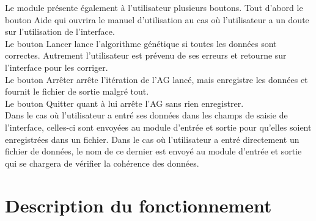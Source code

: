 \documentclass[a4paper,11pt]{article}
\begin{document}
			Le module présente également à l’utilisateur plusieurs boutons.
			Tout d’abord le bouton Aide qui ouvrira le manuel d’utilisation au cas où l’utilisateur a un doute sur l’utilisation de l’interface.\\
			Le bouton Lancer lance l’algorithme génétique si toutes les données sont correctes.
			Autrement l’utilisateur est prévenu de ses erreurs et retourne sur l’interface pour les corriger.\\
			Le bouton Arrêter arrête l’itération de l’AG lancé, mais enregistre les données et fournit le fichier de sortie malgré tout.\\
			Le bouton Quitter quant à lui arrête l’AG sans rien enregistrer.\\
			Dans le cas où l’utilisateur a entré ses données dans les champs de saisie de l’interface, celles-ci sont envoyées au module d’entrée et sortie pour qu’elles soient enregistrées dans un fichier.
			Dans le cas où l’utilisateur a entré directement un fichier de données, le nom de ce dernier est envoyé au module d’entrée et sortie qui se chargera de vérifier la cohérence des données.\\
	
	\section{Description du fonctionnement}
\end{document}
